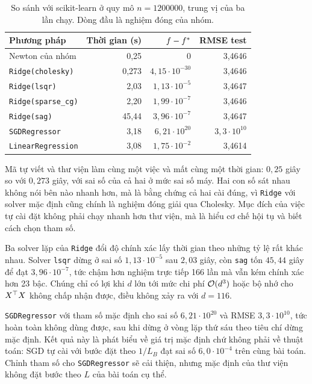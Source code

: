 \documentclass[12pt, a4paper, oneside]{report}
\theoremstyle{definition}
\begin{document}
\begin{table}[tbp]
  \centering
  \caption{So sánh với scikit-learn ở quy mô $n = \num{1200000}$, trung vị của
    ba lần chạy. Dòng đầu là nghiệm đóng của nhóm.}
  \label{tab:library}
  \begin{tabular}{lrrr}
    \toprule
    Phương pháp & Thời gian (s) & $f - f^{*}$ & RMSE test \\
    \midrule
    Newton của nhóm            & 0{,}25  & $0$                    & 3{,}4646 \\
    \texttt{Ridge(cholesky)}   & 0{,}273 & $4{,}15 \cdot 10^{-30}$ & 3{,}4646 \\
    \texttt{Ridge(lsqr)}       & 2{,}03  & $1{,}13 \cdot 10^{-5}$  & 3{,}4647 \\
    \texttt{Ridge(sparse\_cg)} & 2{,}20  & $1{,}99 \cdot 10^{-7}$  & 3{,}4646 \\
    \texttt{Ridge(sag)}        & 45{,}44 & $3{,}96 \cdot 10^{-7}$  & 3{,}4647 \\
    \texttt{SGDRegressor}      & 3{,}18  & $6{,}21 \cdot 10^{20}$  & $3{,}3 \cdot 10^{10}$ \\
    \texttt{LinearRegression}  & 3{,}08  & $1{,}75 \cdot 10^{-2}$  & 3{,}4614 \\
    \bottomrule
  \end{tabular}
\end{table}

Mã tự viết và thư viện làm cùng một việc và mất cùng một thời gian: $0{,}25$ giây
so với $0{,}273$ giây, với sai số của cả hai ở mức sai số máy. Hai con số sát nhau
không nói bên nào nhanh hơn, mà là bằng chứng cả hai cài đúng, vì
\texttt{Ridge} với solver mặc định cũng chính là nghiệm đóng giải qua Cholesky.
Mục đích của việc tự cài đặt không phải chạy nhanh hơn thư viện, mà là hiểu cơ
chế hội tụ và biết cách chọn tham số.

Ba solver lặp của \texttt{Ridge} đổi độ chính xác lấy thời gian theo những tỷ lệ
rất khác nhau. Solver \texttt{lsqr} dừng ở sai số $1{,}13 \cdot 10^{-5}$ sau $2{,}03$
giây, còn \texttt{sag} tốn $45{,}44$ giây để đạt $3{,}96 \cdot 10^{-7}$, tức chậm
hơn nghiệm trực tiếp 166 lần mà vẫn kém chính xác hơn 23 bậc. Chúng chỉ có lợi
khi $d$ lớn tới mức chi phí $\mathcal{O}(d^{3})$ hoặc bộ nhớ cho $X^{\top} X$ không chấp
nhận được, điều không xảy ra với $d = 116$.

\texttt{SGDRegressor} với tham số mặc định cho sai số $6{,}21 \cdot 10^{20}$ và
RMSE $3{,}3 \cdot 10^{10}$, tức hoàn toàn không dùng được, sau khi dừng ở vòng
lặp thứ sáu theo tiêu chí dừng mặc định. Kết quả này là phát biểu về giá trị mặc
định chứ không phải về thuật toán: SGD tự cài với bước đặt theo $1/L_{B}$ đạt sai
số $6{,}0 \cdot 10^{-4}$ trên cùng bài toán. Chỉnh tham số cho
\texttt{SGDRegressor} sẽ cải thiện, nhưng mặc định của thư viện không đặt bước
theo $L$ của bài toán cụ thể.
\end{document}
